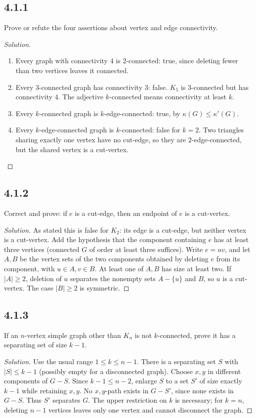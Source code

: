 \documentclass[12pt]{amsart}
\newenvironment{solution}{\begin{proof}[Solution]}{\end{proof}}
\begin{document}
    \subsection*{4.1.1} Prove or refute the four assertions about vertex and edge connectivity.
    \begin{solution}\begin{enumerate}[label=(\alph*),leftmargin=*]
\item Every graph with connectivity $4$ is $2$-connected: true, since deleting fewer than two vertices leaves it connected.
\item Every $3$-connected graph has connectivity $3$: false. $K_5$ is $3$-connected but has connectivity $4$. The adjective $k$-connected means connectivity at least $k$.
\item Every $k$-connected graph is $k$-edge-connected: true, by $\kappa(G)\le\kappa'(G)$.
\item Every $k$-edge-connected graph is $k$-connected: false for $k=2$. Two triangles sharing exactly one vertex have no cut-edge, so they are $2$-edge-connected, but the shared vertex is a cut-vertex.
        \end{enumerate}\end{solution}

    \subsection*{4.1.2} Correct and prove: if $e$ is a cut-edge, then an endpoint of $e$ is a cut-vertex.
    \begin{solution}As stated this is false for $K_2$: its edge is a cut-edge, but neither vertex is a cut-vertex. Add the hypothesis that the component containing $e$ has at least three vertices (connected $G$ of order at least three suffices).
    Write $e=uv$, and let $A,B$ be the vertex sets of the two components obtained by deleting $e$ from its component, with $u\in A,v\in B$. At least one of $A,B$ has size at least two. If $|A|\ge2$, deletion of $u$ separates the nonempty sets $A-\{u\}$ and $B$, so $u$ is a cut-vertex. The case $|B|\ge2$ is symmetric.\end{solution}

    \subsection*{4.1.3} If an $n$-vertex simple graph other than $K_n$ is not $k$-connected, prove it has a separating set of size $k-1$.
    \begin{solution}Use the usual range $1\le k\le n-1$. There is a separating set $S$ with $|S|\le k-1$ (possibly empty for a disconnected graph). Choose $x,y$ in different components of $G-S$. Since $k-1\le n-2$, enlarge $S$ to a set $S'$ of size exactly $k-1$ while retaining $x,y$. No $x,y$-path exists in $G-S'$, since none exists in $G-S$. Thus $S'$ separates $G$.
    The upper restriction on $k$ is necessary; for $k=n$, deleting $n-1$ vertices leaves only one vertex and cannot disconnect the graph.\end{solution}
\end{document}
